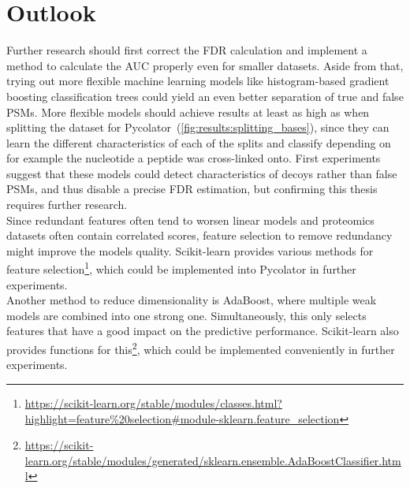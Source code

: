 \section{Outlook}
Further research should first correct the FDR calculation and implement a method to calculate the AUC properly even for smaller datasets. Aside from that, trying out more flexible machine learning models like histogram-based gradient boosting classification trees could yield an even better separation of true and false PSMs. More flexible models should achieve results at least as high as when splitting the dataset for Pycolator~(\ref{fig:results:splitting_bases}), since they can learn the different characteristics of each of the splits and classify depending on for example the nucleotide a peptide was cross-linked onto. First experiments suggest that these models could detect characteristics of decoys rather than false PSMs, and thus disable a precise FDR estimation, but confirming this thesis requires further research.\\
Since redundant features often tend to worsen linear models and proteomics datasets often contain correlated scores, feature selection to remove redundancy might improve the models quality. Scikit-learn provides various methods for feature selection\footnote{\url{https://scikit-learn.org/stable/modules/classes.html?highlight=feature\%20selection\#module-sklearn.feature_selection}}, which could be implemented into Pycolator in further experiments.\\
Another method to reduce dimensionality is AdaBoost, where multiple weak models are combined into one strong one. Simultaneously, this only selects features that have a good impact on the predictive performance. Scikit-learn also provides functions for this\footnote{\url{https://scikit-learn.org/stable/modules/generated/sklearn.ensemble.AdaBoostClassifier.html}}, which could be implemented conveniently in further experiments.